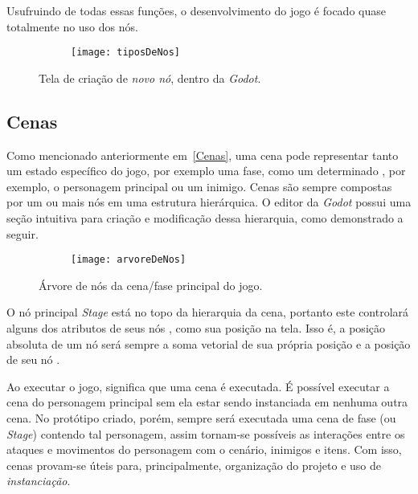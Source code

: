 Usufruindo de todas essas funções, o desenvolvimento do jogo é focado quase totalmente no uso dos nós.

\begin{figure}
    \centering

    \begin{subfigure}{.9\textwidth}
        \centering
        \texttt{[image: tiposDeNos]}
    \end{subfigure}

    \caption{Tela de criação de \textit{novo nó}, dentro da \textit{Godot}.}
\end{figure}

\subsection{Cenas}

Como mencionado anteriormente em~\ref{Cenas}, uma cena pode representar tanto um estado específico do jogo, por exemplo uma fase, como um determinado \textquotedbl{}, por exemplo, o personagem principal ou um inimigo. Cenas são sempre compostas por um ou mais nós em uma estrutura hierárquica. O editor da \textit{Godot} possui uma seção intuitiva para criação e modificação dessa hierarquia, como demonstrado a seguir.

\begin{figure}
    \centering

    \begin{subfigure}{.4\textwidth}
        \centering
        \texttt{[image: arvoreDeNos]}
    \end{subfigure}

    \caption{Árvore de nós da cena/fase principal do jogo.}
\end{figure}

O nó principal \textit{Stage} está no topo da hierarquia da cena, portanto este controlará alguns dos atributos de seus nós \textquotedbl{}, como sua posição na tela. Isso é, a posição absoluta de um nó será sempre a soma vetorial de sua própria posição e a posição de seu nó \textquotedbl{}.

Ao executar o jogo, significa que uma cena é executada. É possível executar a cena do personagem principal sem ela estar sendo instanciada em nenhuma outra cena. No protótipo criado, porém, sempre será executada uma cena de fase (ou \textit{Stage}) contendo tal personagem, assim tornam-se possíveis as interações entre os ataques e movimentos do personagem com o cenário, inimigos e itens. Com isso, cenas provam-se úteis para, principalmente, organização do projeto e uso de \textit{instanciação}.

